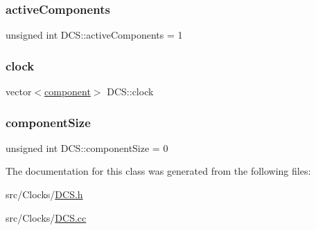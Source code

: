 \subsubsection{\texorpdfstring{active\+Components}{activeComponents}}
{\footnotesize\ttfamily unsigned int D\+C\+S\+::active\+Components = 1}

\mbox{\label{class_d_c_s_adde0f06e934657f25a92b13e04d3fd7d}} 
\subsubsection{\texorpdfstring{clock}{clock}}
{\footnotesize\ttfamily vector$<$\hyperlink{_d_c_s_8h_aff5561f7728e7d2c203fbfeac4a73866}{component}$>$ D\+C\+S\+::clock}

\mbox{\label{class_d_c_s_af256dc5d9b30241bfce2e12d57824bec}} 
\subsubsection{\texorpdfstring{component\+Size}{componentSize}}
{\footnotesize\ttfamily unsigned int D\+C\+S\+::component\+Size = 0}



The documentation for this class was generated from the following files\+:\begin{DoxyCompactItemize}
\item 
src/\+Clocks/\hyperlink{_d_c_s_8h}{D\+C\+S.\+h}\item 
src/\+Clocks/\hyperlink{_d_c_s_8cc}{D\+C\+S.\+cc}\end{DoxyCompactItemize}
